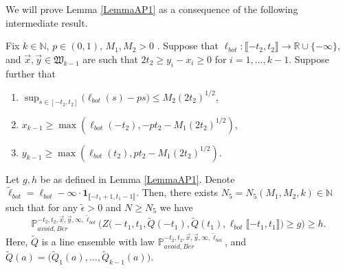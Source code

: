 	We will prove Lemma \ref{LemmaAP1} as a consequence of the following intermediate result.
	
	\begin{lemma}\label{LemmaAP2} Fix $k \in \mathbb{N}$, $p \in (0,1)$, $M_1, M_2 > 0$ . Suppose that $\ell_{bot}: \llbracket -t_2, t_2 \rrbracket \rightarrow \mathbb{R} \cup \{ - \infty \}$, and $\vec{x}, \vec{y} \in \mathfrak{W}_{k-1}$ are such that $2t_2 \geq y_i-x_i \geq 0$ for $i = 1, \dots, k-1$. Suppose further that
		\begin{enumerate}
			\item $\sup_{s \in [ -t_2,t_2]}\big(\ell_{bot}(s)  - ps \big)  \leq M_2 (2t_2)^{1/2}$,
			\item  $ x_{k-1} \geq \max\left(\ell_{bot}(-t_2), -pt_2- M_1 (2t_2)^{1/2}\right),$
			\item $ y_{k-1} \geq  \max \left( \ell_{bot}(t_2),  p t_2- M_1(2t_2)^{1/2} \right).$
		\end{enumerate}
		Let $g,h$ be as defined in Lemma \ref{LemmaAP1}. Denote $\widetilde{\ell}_{bot} = \ell_{bot} - \infty\cdot\mathbf{1}_{\llbracket -t_1 + 1, t_1 - 1\rrbracket}$. Then, there exists $N_5 = N_5(M_1,M_2,k ) \in \mathbb{N}$  such that for any $\tilde{\epsilon}  > 0$ and $N \geq N_5$ we have
		\begin{equation}\label{eqn61}
		\mathbb{P}^{-t_2, t_2, \vec{x},\vec{y}, \infty, \widetilde{\ell}_{bot} }_{avoid, Ber} \Big( Z\big(  -t_1, t_1, \widetilde{Q}(-t_1) , \widetilde{Q}(t_1), \ell_{bot}\llbracket -t_1, t_1\rrbracket\big) \geq g   \Big)  \geq h.
		\end{equation}
		Here, $\widetilde{Q}$ is a line ensemble with law $\mathbb{P}^{-t_2, t_2, \vec{x},\vec{y}, \infty, \widetilde{\ell}_{bot} }_{avoid, Ber}$, and $\widetilde{Q}(a) = \big(\widetilde{Q}_1(a),\dots,\widetilde{Q}_{k-1}(a)\big)$.
		
	\end{lemma}

